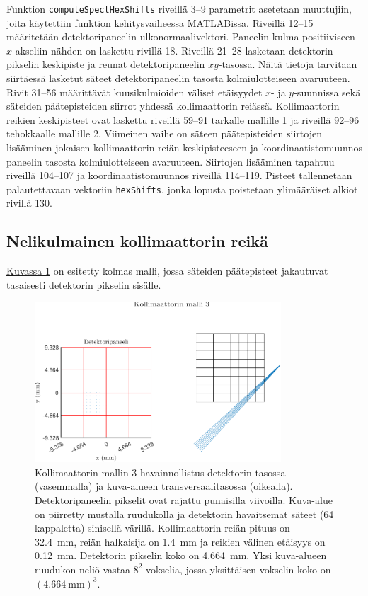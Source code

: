 Funktion \texttt{computeSpectHexShifts} riveillä 3--9 parametrit asetetaan muuttujiin, joita käytettiin funktion kehitysvaiheessa MATLABissa. Riveillä 12--15 määritetään detektoripaneelin ulkonormaalivektori. Paneelin kulma positiiviseen $x$-akseliin nähden on laskettu rivillä 18. Riveillä 21--28 lasketaan detektorin pikselin keskipiste ja reunat detektoripaneelin $xy$-tasossa. Näitä tietoja tarvitaan siirtäessä lasketut säteet detektoripaneelin tasosta kolmiulotteiseen avaruuteen. Rivit 31--56 määrittävät kuusikulmioiden väliset etäisyydet $x$- ja $y$-suunnissa sekä säteiden päätepisteiden siirrot yhdessä kollimaattorin reiässä. Kollimaattorin reikien keskipisteet ovat laskettu riveillä 59--91 tarkalle mallille 1 ja riveillä 92--96 tehokkaalle mallille 2. Viimeinen vaihe on säteen päätepisteiden siirtojen lisääminen jokaisen kollimaattorin reiän keskipisteeseen ja koordinaatistomuunnos paneelin tasosta kolmiulotteiseen avaruuteen. Siirtojen lisääminen tapahtuu riveillä 104--107 ja koordinaatistomuunnos riveillä 114--119. Pisteet tallennetaan palautettavaan vektoriin \texttt{hexShifts}, jonka lopusta poistetaan ylimääräiset alkiot rivillä 130.

\subsection{Nelikulmainen kollimaattorin reikä}
\hyperref[fig:ray3]{Kuvassa \ref*{fig:ray3}} on esitetty kolmas malli, jossa säteiden päätepisteet jakautuvat tasaisesti detektorin pikselin sisälle.

\begin{figure}[H]
    \centering
    \captionsetup{width=.9\textwidth}
    \includegraphics[height=6cm]{kuvat/malli3.pdf}
    \caption{Kollimaattorin mallin 3 havainnollistus detektorin tasossa (vasemmalla) ja kuva-alueen transversaalitasossa (oikealla). Detektoripaneelin pikselit ovat rajattu punaisilla viivoilla. Kuva-alue on piirretty mustalla ruudukolla ja detektorin havaitsemat säteet (64 kappaletta) sinisellä värillä. Kollimaattorin reiän pituus on \qty{32.4}{\milli\meter}, reiän halkaisija on \qty{1.4}{\milli\meter} ja reikien välinen etäisyys on \qty{0.12}{\milli\meter}. Detektorin pikselin koko on \qty{4.664}{\milli\meter}. Yksi kuva-alueen ruudukon neliö vastaa $8^2$ vokselia, jossa yksittäisen vokselin koko on $(\qty{4.664}{\milli\meter})^{3}$.}
    \label{fig:ray3}
\end{figure}

